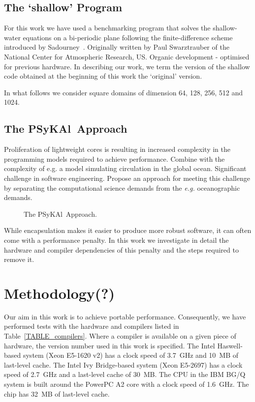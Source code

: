 \documentclass[journal]{IEEEtran}
\newcommand{\psykal}{{PS}y{KA}l\ }
\begin{document}
\subsection{The `shallow' Program}
For this work we have used a benchmarking program that solves the
shallow-water equations on a bi-periodic plane following the
finite-difference scheme introduced by Sadourney~\cite{sadourny75}.
Originally written by Paul Swarztrauber of the National Center for
Atmospheric Research, US.  Organic development - optimised for
previous hardware. In describing our work, we term the version of the
shallow code obtained at the beginning of this work the `original'
version.

In what follows we consider square domains of dimension 64, 128, 256,
512 and 1024.


\subsection{The \psykal Approach}
Proliferation of lightweight cores is resulting in increased
complexity in the programming models required to achieve performance.
Combine with the complexity of e.g. a model simulating circulation in
the global ocean. Significant challenge in software engineering.
Propose an approach for meeting this challenge by separating the
computational science demands from the {\it e.g.} oceanographic
demands.

\begin{figure}
\centering
\caption{The \psykal Approach.}
\end{figure}

While encapsulation makes it easier to produce more robust software,
it can often come with a performance penalty. In this work we
investigate in detail the hardware and compiler dependencies of this
penalty and the steps required to remove it.

\section{Methodology(?)}

Our aim in this work is to achieve portable performance. Consequently,
we have performed tests with the hardware and compilers listed in
Table~\ref{TABLE_compilers}. Where a compiler is available on a given
piece of hardware, the version number used in this work is specified.
The Intel Haswell-based system (Xeon E5-1620 v2) has a clock speed of
3.7~GHz and 10~MB of last-level cache. The Intel Ivy Bridge-based
system (Xeon E5-2697) has a clock speed of 2.7~GHz and a last-level
cache of 30~MB. The CPU in the IBM BG/Q system is built around the
PowerPC A2 core with a clock speed of 1.6~GHz. The chip has 32~MB of
last-level cache.
\end{document}
